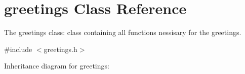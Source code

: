 \hypertarget{classgreetings}{}\section{greetings Class Reference}
\label{classgreetings}


The greetings class\+: class containing all functions nessisary for the greetings.  




{\ttfamily \#include $<$greetings.\+h$>$}



Inheritance diagram for greetings\+:
